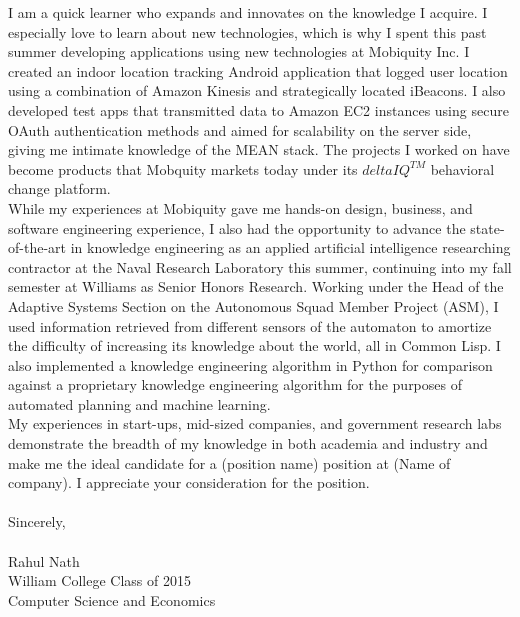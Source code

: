 \documentclass[11pt]{letter} %
\newcommand{\forceindent}{\leavevmode{\parindent=24pt\indent}}
\begin{document}
\forceindent I am a quick learner who expands and innovates on the knowledge I acquire. I especially love to learn about new technologies, which is why I spent this past summer developing applications using new technologies at Mobiquity Inc. I created an indoor location tracking Android application that logged user location using a combination of Amazon Kinesis and strategically located iBeacons. I also developed test apps that transmitted data to Amazon EC2 instances using secure OAuth authentication methods and aimed for scalability on the server side, giving me intimate knowledge of the MEAN stack. The projects I worked on have become products that Mobquity markets today under its $deltaIQ^{TM}$ behavioral change platform. \\ %

\forceindent While my experiences at Mobiquity gave me hands-on design, business, and software engineering experience, I also had the opportunity to advance the state-of-the-art in knowledge engineering as an applied artificial intelligence researching contractor at the Naval Research Laboratory this summer, continuing into my fall semester at Williams as Senior Honors Research. Working under the Head of the Adaptive Systems Section on the Autonomous Squad Member Project (ASM), I used information retrieved from different sensors of the automaton to amortize the difficulty of increasing its knowledge about the world, all in Common Lisp. I also implemented a knowledge engineering algorithm in Python for comparison against a proprietary knowledge engineering algorithm for the purposes of automated planning and machine learning. \\

\forceindent My experiences in start-ups, mid-sized companies, and government research labs demonstrate the breadth of my knowledge in both academia and industry and make me the ideal candidate for a (position name) position at (Name of company). I appreciate your consideration for the position. \\ \\

Sincerely, \\ \\
Rahul Nath \\
William College Class of 2015  \\
Computer Science and Economics \\



\end{document}
